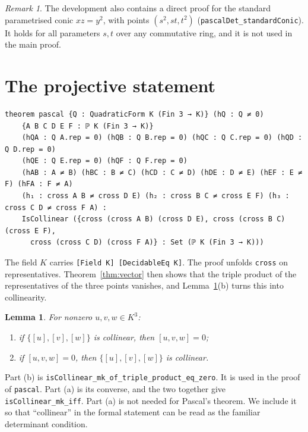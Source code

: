\documentclass[11pt]{article}
\newtheorem{lemma}[theorem]{Lemma}
\theoremstyle{remark}
\newtheorem{remark}[theorem]{Remark}
\newcommand{\lean}[1]{\texttt{#1}}
\newcommand{\br}[1]{[#1]}
\begin{document}
\begin{remark}\label{rem:standard}
The development also contains a direct proof for the standard parametrised conic $xz=y^2$, with
points $(s^2,st,t^2)$ (\lean{pascalDet\_standardConic}). It holds for all parameters $s,t$ over any
commutative ring, and it is not used in the main proof.
\end{remark}

\section{The projective statement}\label{sec:proj}

\begin{lstlisting}
theorem pascal {Q : QuadraticForm K (Fin 3 → K)} (hQ : Q ≠ 0)
    {A B C D E F : ℙ K (Fin 3 → K)}
    (hQA : Q A.rep = 0) (hQB : Q B.rep = 0) (hQC : Q C.rep = 0) (hQD : Q D.rep = 0)
    (hQE : Q E.rep = 0) (hQF : Q F.rep = 0)
    (hAB : A ≠ B) (hBC : B ≠ C) (hCD : C ≠ D) (hDE : D ≠ E) (hEF : E ≠ F) (hFA : F ≠ A)
    (h₁ : cross A B ≠ cross D E) (h₂ : cross B C ≠ cross E F) (h₃ : cross C D ≠ cross F A) :
    IsCollinear ({cross (cross A B) (cross D E), cross (cross B C) (cross E F),
      cross (cross C D) (cross F A)} : Set (ℙ K (Fin 3 → K)))
\end{lstlisting}

The field $K$ carries \lean{[Field K] [DecidableEq K]}. The proof unfolds \lean{cross} on
representatives. Theorem~\ref{thm:vector} then shows that the triple product of the representatives
of the three points vanishes, and Lemma~\ref{lem:collinear}(b) turns this into collinearity.

\begin{lemma}\label{lem:collinear}
For nonzero $u,v,w\in K^3$:
\begin{enumerate}
\item[(a)] if $\{[u],[v],[w]\}$ is collinear, then $\br{u,v,w}=0$;
\item[(b)] if $\br{u,v,w}=0$, then $\{[u],[v],[w]\}$ is collinear.
\end{enumerate}
\end{lemma}

Part (b) is \lean{isCollinear\_mk\_of\_triple\_product\_eq\_zero}. It is used in the proof of
\lean{pascal}. Part (a) is its converse, and the two together give \lean{isCollinear\_mk\_iff}.
Part (a) is not needed for Pascal's theorem. We include it so that ``collinear'' in the formal
statement can be read as the familiar determinant condition.
\end{document}
